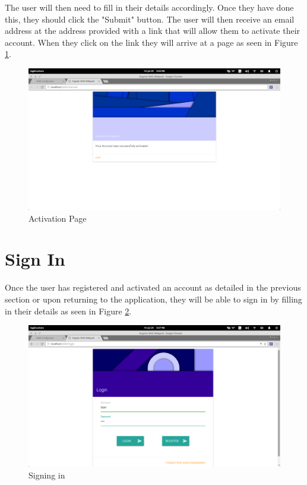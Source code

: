 \documentclass[11pt,a4paper]{article}
\begin{document}
The user will then need to fill in their details accordingly. Once they have done this, they should click the "Submit" 
button. The user will then receive an email address at the address provided with a link that will allow them to activate
their account. When they click on the link they will arrive at a page as seen in Figure \ref{fig:activatePage}.
\begin{figure}[H]
	\begin{center}
		\includegraphics[scale=0.6]{../Images/User Manual/Activation Page.png}
		\caption{Activation Page}
		\label{fig:activatePage}
	\end{center}  
\end{figure}

\section{Sign In}
Once the user has registered and activated an account as detailed in the previous section or upon returning to the application,
they will be able to sign in by filling in their details as seen in Figure \ref{fig:signPage}.
\begin{figure}[H]
	\begin{center}
		\includegraphics[scale=0.6]{../Images/User Manual/Sign in Page.png}
		\caption{Signing in}
		\label{fig:signPage}
	\end{center}  
\end{figure}
\end{document}
